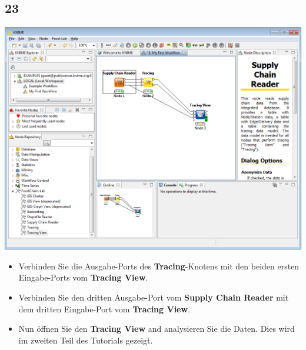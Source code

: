 \documentclass{beamer}
\begin{document}
\subsection{23}
\begin{frame}
	\begin{center}
  		\includegraphics[height=0.5\textheight]{23.png}
	\end{center}
	\begin{itemize}
		\item Verbinden Sie die Ausgabe-Ports des \textbf{Tracing}-Knotens mit den beiden ersten Eingabe-Ports vom \textbf{Tracing View}.
		\item Verbinden Sie den dritten Ausgabe-Port vom \textbf{Supply Chain Reader} mit dem dritten Eingabe-Port vom \textbf{Tracing View}.
		\item Nun öffnen Sie den \textbf{Tracing View} and analysieren Sie die Daten. Dies wird im zweiten Teil des Tutorials gezeigt.
	\end{itemize}
\end{frame}
\end{document}
